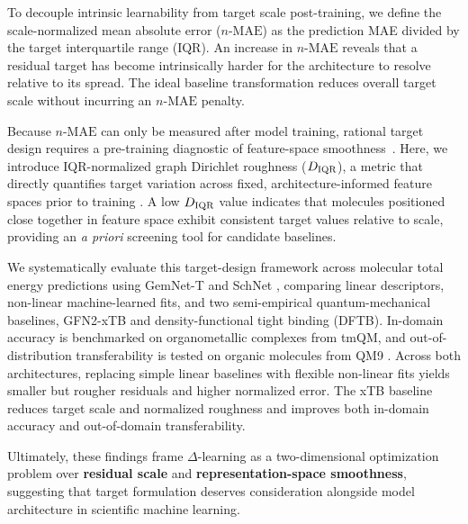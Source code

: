 To decouple intrinsic learnability from target scale post-training, we define the scale-normalized mean absolute error ($n\text{-MAE}$) as the prediction MAE divided by the target interquartile range ($\text{IQR}$). An increase in $n\text{-MAE}$ reveals that a residual target has become intrinsically harder for the architecture to resolve relative to its spread. The ideal baseline transformation reduces overall target scale without incurring an $n\text{-MAE}$ penalty.

Because $n\text{-MAE}$ can only be measured after model training, rational target design requires a pre-training diagnostic of feature-space smoothness~\cite{aldeghi2022roughness,graff2023rogiXD}. Here, we introduce IQR-normalized graph Dirichlet roughness ($D_{\rm IQR}$), a metric that directly quantifies target variation across fixed, architecture-informed feature spaces prior to training \cite{belkin2006manifold}. A low $D_{\rm IQR}$ value indicates that molecules positioned close together in feature space exhibit consistent target values relative to scale, providing an \emph{a priori} screening tool for candidate baselines.

We systematically evaluate this target-design framework across molecular total energy predictions using GemNet-T and SchNet \cite{gasteiger2021gemnet,schutt2023schnetpack2}, comparing linear descriptors, non-linear machine-learned fits, and two semi-empirical quantum-mechanical baselines, GFN2-xTB \cite{bannwarth2019gfn2xtb} and density-functional tight binding (DFTB). In-domain accuracy is benchmarked on organometallic complexes from tmQM, and out-of-distribution transferability is tested on organic molecules from QM9 \cite{balcells2020tmqm,ramakrishnan2014quantum}. Across both architectures, replacing simple linear baselines with flexible non-linear fits yields smaller but rougher residuals and higher normalized error. The xTB baseline reduces target scale and normalized roughness and improves both in-domain accuracy and out-of-domain transferability.

Ultimately, these findings frame $\Delta$-learning as a two-dimensional optimization problem over \textbf{residual scale} and \textbf{representation-space smoothness}, suggesting that target formulation deserves consideration alongside model architecture in scientific machine learning.
